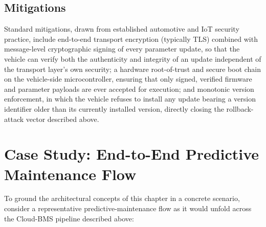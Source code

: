 \subsection{Mitigations}
\label{subsec:15_mitigations}

Standard mitigations, drawn from established automotive and IoT security practice, include end-to-end transport encryption (typically TLS) combined with message-level cryptographic signing of every parameter update, so that the vehicle can verify both the authenticity and integrity of an update independent of the transport layer's own security; a hardware root-of-trust and secure boot chain on the vehicle-side microcontroller, ensuring that only signed, verified firmware and parameter payloads are ever accepted for execution; and monotonic version enforcement, in which the vehicle refuses to install any update bearing a version identifier older than its currently installed version, directly closing the rollback-attack vector described above.



\section{Case Study: End-to-End Predictive Maintenance Flow}
\label{sec:15_case_study}

To ground the architectural concepts of this chapter in a concrete scenario, consider a representative predictive-maintenance flow as it would unfold across the Cloud-BMS pipeline described above:

